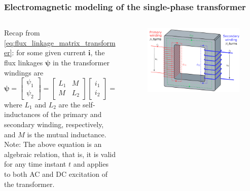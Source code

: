 \begin{frame}
	\frametitle{Electromagnetic modeling of the single-phase transformer}
    \begin{columns}
		\begin{column}{0.45\textwidth}
            Recap from \eqref{eq:flux_linkage_matrix_transformer}: for some given current $\bm{i}$, the flux linkages $\bm{\psi}$ in the transformer windings are
			\begin{equation*}
				\bm{\psi} = \begin{bmatrix} \psi_1 \\ \psi_2 \end{bmatrix} = \begin{bmatrix} L_1 & M \\ M & L_2 \end{bmatrix} \begin{bmatrix} i_1 \\ i_2 \end{bmatrix} = \bm{L}\bm{i}
			\end{equation*}
			where $L_1$ and $L_2$ are the self-inductances of the primary and secondary winding, respectively, and $M$ is the mutual inductance.
			\\[1em]
			Note: The above equation is an algebraic relation, that is, it is valid for any time instant $t$ and applies to both AC and DC excitation of the transformer. 
		\end{column}
        \hfill
		\begin{column}{0.525\textwidth}
			\begin{figure}
				\centering
				\includegraphics[height=0.575\textheight]{fig/lec02/Transformer3d_col3.pdf}
			\end{figure}
		\end{column}
		\end{columns}
\end{frame}


